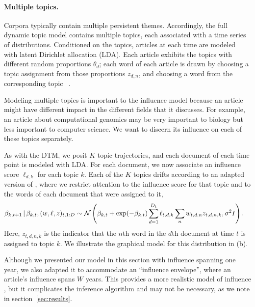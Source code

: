 \paragraph{Multiple topics.}  Corpora typically contain multiple
persistent themes.  Accordingly, the full dynamic topic model contains
multiple topics, each associated with a time series of distributions.
Conditioned on the topics, articles at each time are modeled
with latent Dirichlet allocation (LDA).  Each article exhibits the
topics with different random proportions $\theta_d$; each word of each
article is drawn by choosing a topic assignment from those proportions
$z_{d,n}$, and choosing a word from the corresponding topic
~\citep{blei:2003}.

Modeling multiple topics is important to the influence model because
an article might have different impact in the different fields that it
discusses.  For example, an article about computational genomics may
be very important to biology but less important to computer science.
We want to discern its influence on each of these topics separately.

As with the DTM, we posit $K$ topic trajectories, and each document of
each time point is modeled with LDA.  For each document, we now
associate an influence score $\ell_{d,k}$ for each topic $k$.  Each of
the $K$ topics drifts according to an adapted version of
, where we restrict attention to the influence
score for that topic and to the words of each document that were
assigned to it,
\begin{equation}
  \begin{split}
    \label{eq:logistic-normal-influence-topics}
    \beta_{k,t+1} & \, | \, \beta_{k,t}, (w, \ell, z)_{t,1:D} \sim
    \mathcal{N}\left(
      \beta_{k,t} +
      \exp(-\beta_{k,t}) \sum_{d=1}^{D_t} \ell_{t,d,k} \sum_n w_{t,d,n} z_{t,d,n,k},
      \sigma^2 I
    \right).
  \end{split}
\end{equation}
Here, $z_{t,d,n,k}$ is the indicator that the $n$th word in the $d$th
document at time $t$ is assigned to topic $k$.  We illustrate the
graphical model for this distribution in  (b).

Although we presented our model in this section with influence
spanning one year, we also adapted it to accommodate an ``influence
envelope'', where an article's influence spans $W$ years.  This
provides a more realistic model of influence \citep{porter:2005}, but
it complicates the inference algorithm and may not be necessary, as we
note in section~\ref{sec:results}.

